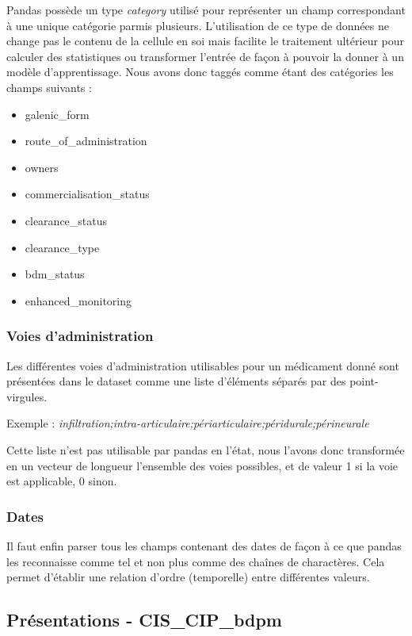 \documentclass[a4paper, 12pt]{article}
\begin{document}
Pandas possède un type \textit{category} utilisé pour représenter un champ correspondant à une unique catégorie parmis plusieurs. L'utilisation de ce type de données ne change pas le contenu de la cellule en soi mais facilite le traitement ultérieur pour calculer des statistiques ou transformer l'entrée de façon à pouvoir la donner à un modèle d'apprentissage. Nous avons donc taggés comme étant des catégories les champs suivants : 
\begin{itemize}
\item galenic\_form
\item route\_of\_administration
\item owners
\item commercialisation\_status
\item clearance\_status
\item clearance\_type
\item bdm\_status
\item enhanced\_monitoring
\end{itemize}

\subsubsection*{Voies d'administration}

Les différentes voies d'administration utilisables pour un médicament donné sont présentées dans le dataset comme une liste d'éléments séparés par des point-virgules. 

Exemple : \textit{infiltration;intra-articulaire;périarticulaire;péridurale;périneurale}

Cette liste n'est pas utilisable par pandas en l'état, nous l'avons donc transformée en un vecteur de longueur l'ensemble des voies possibles, et de valeur 1 si la voie est applicable, 0 sinon.


\subsubsection*{Dates}

Il faut enfin parser tous les champs contenant des dates de façon à ce que pandas les reconnaisse comme tel et non plus comme des chaînes de charactères. Cela permet d'établir une relation d'ordre (temporelle) entre différentes valeurs.

\subsection{Présentations - CIS\_CIP\_bdpm}
\end{document}
